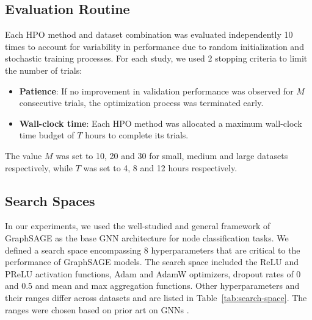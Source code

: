 \subsection{Evaluation Routine}
Each HPO method and dataset combination was evaluated independently 10 times to account for variability in performance due to random initialization and stochastic training processes. For each study, we used 2 stopping criteria to limit the number of trials:
\begin{itemize}
	\item \textbf{Patience}: If no improvement in validation performance was observed for \( M \) consecutive trials, the optimization process was terminated early.
	\item \textbf{Wall-clock time}: Each HPO method was allocated a maximum wall-clock time budget of \( T \) hours to complete its trials.
\end{itemize}
The value \( M \) was set to 10, 20 and 30 for small, medium and large datasets respectively, while \( T \) was set to 4, 8 and 12 hours respectively.

\subsection{Search Spaces}

In our experiments, we used the well-studied and general framework of GraphSAGE \cite{hamilton_inductive_2017} as the base GNN architecture for node classification tasks. We defined a search space encompassing 8 hyperparameters that are critical to the performance of GraphSAGE models. The search space included the ReLU and PReLU activation functions, Adam and AdamW optimizers, dropout rates of 0 and 0.5 and mean and max aggregation functions. Other hyperparameters and their ranges differ across datasets and are listed in Table~\ref{tab:search-space}. The ranges were chosen based on prior art on GNNs \cite{hamilton_inductive_2017, zeng_graphsaint_2019, zhu_beyond_2020, yang_vqgraph_2023, den_boef_graphpope_2021, li_finding_2022}.

